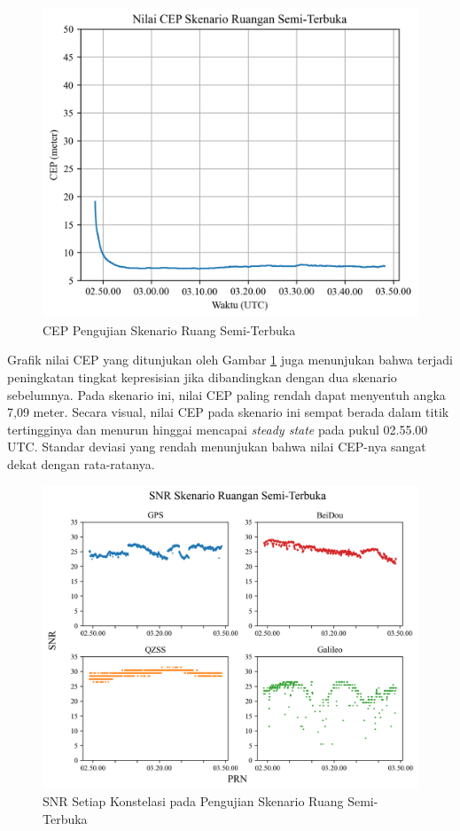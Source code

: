 \begin{figure}[H]
	\centering
	\includegraphics[width=13cm]{contents/chapter-4/3-skenario-semioutdoor/cep.png}
	\caption{CEP Pengujian Skenario Ruang Semi-Terbuka}
	\label{Fig: semioutdoor-cep}
\end{figure}

Grafik nilai CEP yang ditunjukan oleh Gambar \ref{Fig: semioutdoor-cep} juga menunjukan bahwa terjadi peningkatan tingkat kepresisian jika dibandingkan dengan dua skenario sebelumnya. Pada skenario ini, nilai CEP paling rendah dapat menyentuh angka 7,09 meter. Secara visual, nilai CEP pada skenario ini sempat berada dalam titik tertingginya dan menurun hinggai mencapai \textit{steady state} pada pukul 02.55.00 UTC. Standar deviasi yang rendah menunjukan bahwa nilai CEP-nya sangat dekat dengan rata-ratanya.

\begin{figure}[H]
	\centering
	\captionsetup{justification=centering}
	\includegraphics[width=13cm]{contents/chapter-4/3-skenario-semioutdoor/snr.png}
	\caption{SNR Setiap Konstelasi pada Pengujian Skenario Ruang Semi-Terbuka}
	\label{Fig: semioutdoor-snr}
\end{figure}

